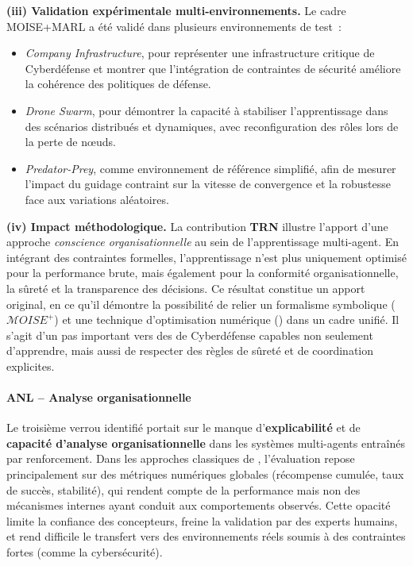 \medskip
\noindent
\textbf{(iii) Validation expérimentale multi-environnements.}
Le cadre MOISE+MARL a été validé dans plusieurs environnements de test~:
\begin{itemize}
  \item \textit{Company Infrastructure}, pour représenter une infrastructure critique de Cyberdéfense et montrer que l'intégration de contraintes de sécurité améliore la cohérence des politiques de défense.
  \item \textit{Drone Swarm}, pour démontrer la capacité à stabiliser l'apprentissage dans des scénarios distribués et dynamiques, avec reconfiguration des rôles lors de la perte de nœuds.
  \item \textit{Predator-Prey}, comme environnement de référence simplifié, afin de mesurer l'impact du guidage contraint sur la vitesse de convergence et la robustesse face aux variations aléatoires.
\end{itemize}

\medskip
\noindent
\textbf{(iv) Impact méthodologique.}
La contribution \textbf{TRN} illustre l'apport d'une approche \textit{consci\-ence organisationnelle} au sein de l'apprentissage multi-agent.
En intégrant des contraintes formelles, l'apprentissage n'est plus uniquement optimisé pour la performance brute, mais également pour la conformité organisationnelle, la sûreté et la transparence des décisions.
Ce résultat constitue un apport original, en ce qu'il démontre la possibilité de relier un formalisme symbolique ($\mathcal{M}OISE^+$) et une technique d'optimisation numérique () dans un cadre unifié.
Il s'agit d'un pas important vers des  de Cyberdéfense capables non seulement d'apprendre, mais aussi de respecter des règles de sûreté et de coordination explicites.

\paragraph{ANL – Analyse organisationnelle}

Le troisième verrou identifié portait sur le manque d'\textbf{explicabilité} et de \textbf{capacité d'analyse organisationnelle} dans les systèmes multi-agents entraînés par renforcement.
Dans les approches classiques de , l'évaluation repose principalement sur des métriques numériques globales (récompense cumulée, taux de succès, stabilité), qui rendent compte de la performance mais non des mécanismes internes ayant conduit aux comportements observés.
Cette opacité limite la confiance des concepteurs, freine la validation par des experts humains, et rend difficile le transfert vers des environnements réels soumis à des contraintes fortes (comme la cybersécurité).

